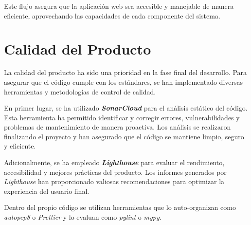 Este flujo asegura que la aplicación web sea accesible y manejable de manera eficiente, aprovechando las capacidades de cada componente del sistema.

\section{Calidad del Producto}
La calidad del producto ha sido una prioridad en la fase final del desarrollo. Para asegurar que el código cumple con los estándares, se han implementado diversas herramientas y metodologías de control de calidad.

En primer lugar, se ha utilizado \textbf{\textit{SonarCloud}} para el análisis estático del código. Esta herramienta ha permitido identificar y corregir errores, vulnerabilidades y problemas de mantenimiento de manera proactiva. Los análisis se realizaron finalizando el proyecto y han asegurado que el código se mantiene limpio, seguro y eficiente.

Adicionalmente, se ha empleado \textbf{\textit{Lighthouse}} para evaluar el rendimiento, accesibilidad y mejores prácticas del producto. Los informes generados por \textit{Lighthouse} han proporcionado valiosas recomendaciones para optimizar la experiencia del usuario final.

Dentro del propio código se utilizan herramientas que lo auto-organizan como \textit{autopep8} o \textit{Prettier} y lo evaluan como \textit{pylint} o \textit{mypy}.
